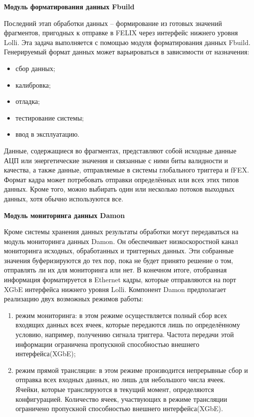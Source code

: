 \textbf{Модуль форматирования данных Fbuild}\par
Последний этап обработки данных -- формирование из готовых значений фрагментов, пригодных к отправке в FELIX через интерфейс нижнего уровня Lolli. Эта задача выполняется с помощью модуля форматирования данных Fbuild. Генерируемый формат данных может варьироваться в зависимости от назначения:\par
\begin{itemize}
    \item сбор данных;
    \item калибровка;
    \item отладка;
    \item тестирование системы;
    \item ввод в эксплуатацию.
\end{itemize}\par
Данные, содержащиеся во фрагментах, представляют собой исходные данные АЦП или энергетические значения и связанные с ними биты валидности и качества, а также данные, отправляемые в системы глобального триггера и fFEX. Формат кадра может потребовать отправки определённых или всех этих типов данных. Кроме того, можно выбирать один или несколько потоков выходных данных, хотя обычно используются все.\par
\textbf{Модуль мониторинга данных Damon}\par
Кроме системы хранения данных результаты обработки могут передаваться на модуль мониторинга данных Damon. Он обеспечивает низкоскоростной канал мониторинга исходных, обработанных и триггерных данных. Эти собранные значения буферизируются до тех пор, пока не будет принято решение о том, отправлять ли их для мониторинга или нет. В конечном итоге, отобранная информация форматируется в Ethernet кадры, которые отправляются на порт XGbE интерфейса нижнего уровня Lolli. Компонент Damon предполагает реализацию двух возможных режимов работы:\par
\begin{enumerate}
    \item режим мониторинга: в этом режиме осуществляется полный сбор всех входящих данных всех ячеек, которые передаются лишь по определённому условию, например, получению сигнала триггера. Частота передачи этой информации ограничена пропускной способностью внешнего интерфейса(XGbE);
    \item режим прямой трансляции: в этом режиме производится непрерывные сбор и отправка всех входных данных, но лишь для небольшого числа ячеек. Ячейки, которые транслируются в текущий момент, определяются конфигурацией. Количество ячеек, участвующих в режиме трансляции ограничено пропускной способностью внешнего интерфейса(XGbE).
\end{enumerate}\par
